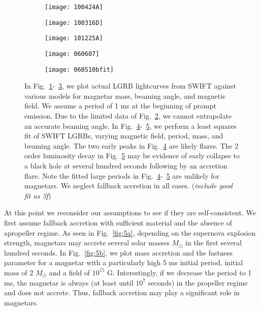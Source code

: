 \documentclass{article}
\begin{document}
\begin{figure}[h!]
\centering
\begin{subfigure}{.5\textwidth}
    \centering
    \texttt{[image: 100424A]}
    \caption{}
    \label{fig:3a}
\end{subfigure}%
\begin{subfigure}{.5\textwidth}
    \centering
    \texttt{[image: 100316D]}
    \caption{}
    \label{fig:3b}
\end{subfigure}
\begin{subfigure}{.5\textwidth}
    \centering
    \texttt{[image: 101225A]}
    \caption{}
    \label{fig:3c}
\end{subfigure}%
\begin{subfigure}{.5\textwidth}
    \centering
    \texttt{[image: 060607]}
    \caption{}
    \label{fig:3d}
\end{subfigure}
\begin{subfigure}{.5\textwidth}
    \centering
    \texttt{[image: 060510bfit]}
    \caption{}
    \label{fig:3e}
\end{subfigure}
\caption{In Fig.~\ref{fig:3a}-~\ref{fig:3c}, we plot actual LGRB lightcurves from SWIFT against various models for magnetar mass, beaming angle, and magnetic field. We assume a period of 1 ms at the beginning of prompt emission. Due to the limited data of Fig.~\ref{fig:3b}, we cannot extrapolate an accurate beaming angle. In Fig.~\ref{fig:3d}-~\ref{fig:3e}, we perform a least squares fit of SWIFT LGRBs, varying magnetic field, period, mass, and beaming angle. The two early peaks in Fig.~\ref{fig:3d} are likely flares. The 2 order luminosity decay in Fig.~\ref{fig:3e} may be evidence of early collapse to a black hole at several hundred seconds following by an accretion flare. Note the fitted large periods in Fig.~\ref{fig:3d}-~\ref{fig:3e} are unlikely for magnetars. We neglect fallback accretion in all cases. (\textit{include good fit as 3f})}
\label{fig:3}
\end{figure}

\newpage
At this point we reconsider our assumptions to see if they are self-consistent. We first assume fallback accretion with sufficient material and the absence of apropeller regime. As seen in Fig.~\ref{fig:5a}, depending on the supernova explosion strength,  magnetars may accrete several solar masses $M_{\odot}$ in the first several hundred seconds. In Fig.~\ref{fig:5b}, we plot mass accretion and the fastness parameter for a magnetar with a particularly high 5 ms initial period, initial mass of 2 $M_{\odot}$ and a field of $10^{15}$ G. Interestingly, if we decrease the period to 1 ms, the magnetar is always (at least until $10^7$ seconds) in the propeller regime and does not accrete. Thus, fallback accretion may play a significant role in  magnetars.
\end{document}
